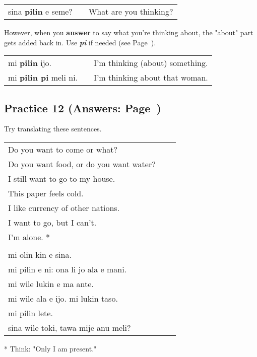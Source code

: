 \begin{supertabular}{p{5,5cm}|ll}
sina \textbf{pilin} e seme? && What are you thinking? \\
\end{supertabular} 

However, when you \textbf{answer} to say what you're thinking about, the "about" part gets added back in. 
Use \textbf{\textit{pi}} if needed (see Page~\pageref{'mistakes_with_pi'}).

\begin{supertabular}{p{5,5cm}|ll}
mi \textbf{pilin} ijo. && I'm thinking (about) something. \\
mi \textbf{pilin pi} meli ni. && I'm thinking about that woman. \\
\end{supertabular} 
% 
\newpage
\subsection*{Practice 12 (Answers: Page~\pageref{'conjunctions_temperature'})}
%
Try translating these sentences. 

\begin{supertabular}{p{5,5cm}|ll}
   Do you want to come or what?    \\ %
   Do you want food, or do you want water?    \\ %
   I still want to go to my house.    \\ %
   This paper feels cold.    \\ %
   I like currency of other nations.   \\  %
   I want to go, but I can't.    \\ %
   I'm alone. *  \\ %
 && \\ %
   mi olin kin e sina.    \\ %
   mi pilin e ni: ona li jo ala e mani.    \\ %
   mi wile lukin e ma ante.    \\ %
   mi wile ala e ijo. mi lukin taso.    \\ %
   mi pilin lete.    \\ %
   sina wile toki, tawa mije anu meli?    \\ %
\end{supertabular} 

* Think: "Only I am present."
%
